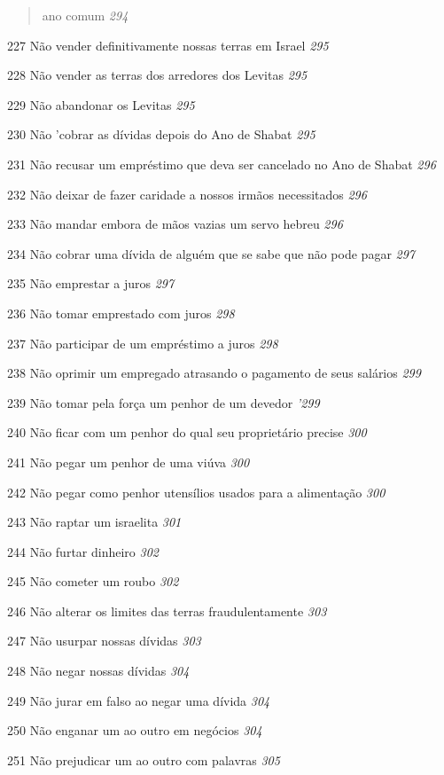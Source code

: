 \begin{quote}
ano comum \emph{294}
\end{quote}

227 Não vender definitivamente nossas terras em Israel \emph{295}

228 Não vender as terras dos arredores dos Levitas \emph{295}

229 Não abandonar os Levitas \emph{295}

230 Não 'cobrar as dívidas depois do Ano de Shabat \emph{295}

231 Não recusar um empréstimo que deva ser cancelado no Ano de Shabat
\emph{296}

232 Não deixar de fazer caridade a nossos irmãos necessitados \emph{296}

233 Não mandar embora de mãos vazias um servo hebreu \emph{296}

234 Não cobrar uma dívida de alguém que se sabe que não pode pagar
\emph{297}

235 Não emprestar a juros \emph{297}

236 Não tomar emprestado com juros \emph{298}

237 Não participar de um empréstimo a juros \emph{298}

238 Não oprimir um empregado atrasando o pagamento de seus salários
\emph{299}

239 Não tomar pela força um penhor de um devedor \emph{'299}

240 Não ficar com um penhor do qual seu proprietário precise \emph{300}

241 Não pegar um penhor de uma viúva \emph{300}

242 Não pegar como penhor utensílios usados para a alimentação
\emph{300}

243 Não raptar um israelita \emph{301}

244 Não furtar dinheiro \emph{302}

245 Não cometer um roubo \emph{302}

246 Não alterar os limites das terras fraudulentamente \emph{303}

247 Não usurpar nossas dívidas \emph{303}

248 Não negar nossas dívidas \emph{304}

249 Não jurar em falso ao negar uma dívida \emph{304}

250 Não enganar um ao outro em negócios \emph{304}

251 Não prejudicar um ao outro com palavras \emph{305}

